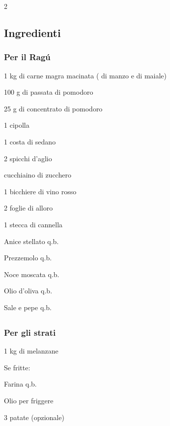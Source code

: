 \newpage
{}

\begin{multicols}{2}
	\subsection*{Ingredienti}
	
	\subsubsection*{Per il Ragú}
	\begin{ingredients}
		\item 1 kg di carne magra macinata ( di manzo e  di maiale)
		\item 100 g di passata di pomodoro
		\item 25 g di concentrato di pomodoro
		\item 1 cipolla
		\item 1 costa di sedano
		\item 2 spicchi d'aglio
		\item {} cucchiaino di zucchero
		\item 1 bicchiere di vino rosso
		\item 2 foglie di alloro
		\item 1 stecca di cannella
		\item Anice stellato q.b.
		\item Prezzemolo q.b.
		\item Noce moscata q.b.
		\item Olio d'oliva q.b.
		\item Sale e pepe q.b.
	\end{ingredients}
	\columnbreak
	\subsection*{ }
	\subsubsection*{Per gli strati}
	\begin{ingredients}
		\item 1 kg di melanzane
		\item Se fritte:
		\begin{ingredients}
			\item Farina q.b.
			\item Olio per friggere
		\end{ingredients}
		\item 3 patate (opzionale)
	\end{ingredients}
	

\end{multicols}
